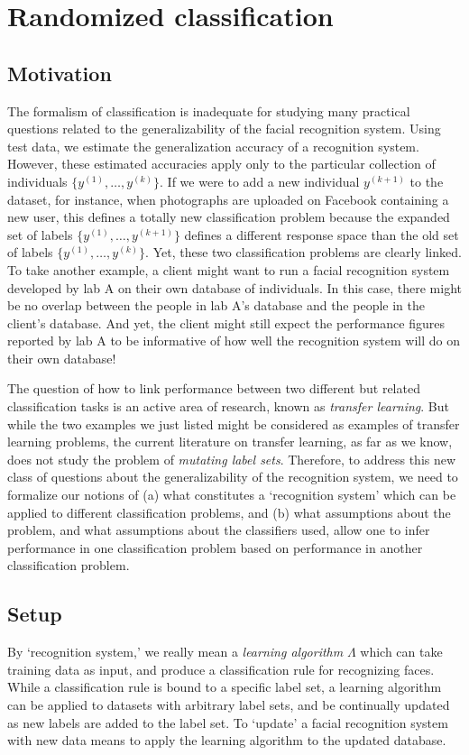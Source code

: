 \section{Randomized classification}\label{sec:rc_motivation}

\subsection{Motivation}
The formalism of classification is inadequate for studying many
practical questions related to the generalizability of the facial
recognition system.  Using test data, we estimate the generalization
accuracy of a recognition system.  However, these estimated accuracies
apply only to the particular collection of individuals
$\{y^{(1)},\hdots, y^{(k)}\}$.  If we were to add a new individual
$y^{(k+1)}$ to the dataset, for instance, when photographs are
uploaded on Facebook containing a new user, this defines a totally new
classification problem because the expanded set of labels
$\{y^{(1)},\hdots, y^{(k+1)}\}$ defines a different response space
than the old set of labels $\{y^{(1)},\hdots, y^{(k)}\}$.  Yet, these
two classification problems are clearly linked.  To take another
example, a client might want to run a facial recognition system
developed by lab A on their own database of individuals.  In this
case, there might be no overlap between the people in lab A's database
and the people in the client's database.  And yet, the client might
still expect the performance figures reported by lab A to be
informative of how well the recognition system will do on their own
database!

The question of how to link performance between two different but
related classification tasks is an active area of research, known as
\emph{transfer learning}.  But while the two examples we just listed
might be considered as examples of transfer learning problems, the
current literature on transfer learning, as far as we know, does not
study the problem of \emph{mutating label sets}.  Therefore, to
address this new class of questions about the generalizability of the
recognition system, we need to formalize our notions of (a) what
constitutes a `recognition system' which can be applied to different
classification problems, and (b) what assumptions about the problem,
and what assumptions about the classifiers used, allow one to infer
performance in one classification problem based on performance in
another classification problem.

\subsection{Setup}
By `recognition system,' we really mean a \emph{learning algorithm}
$\Lambda$ which can take training data as input, and produce a
classification rule for recognizing faces.  While a classification
rule is bound to a specific label set, a learning algorithm can be
applied to datasets with arbitrary label sets, and be continually
updated as new labels are added to the label set.  To `update' a
facial recognition system with new data means to apply the learning
algorithm to the updated database.

